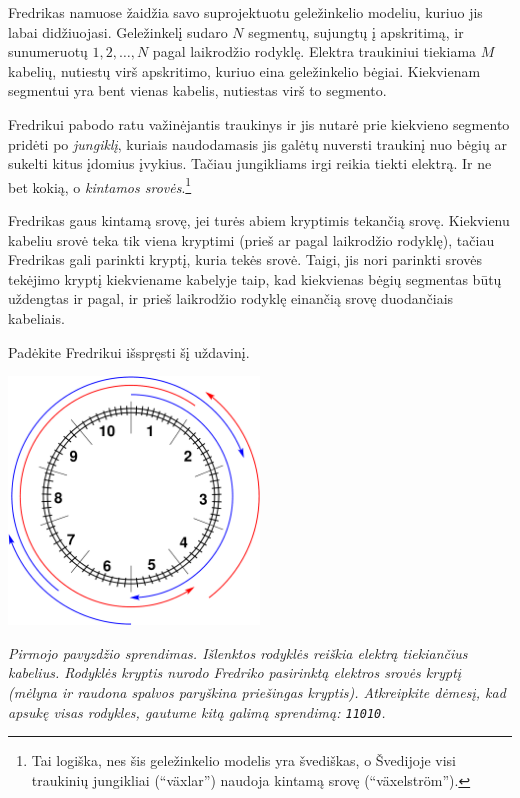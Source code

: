 \ifx\boi\undefined\fi
\def\version{jury-1}
Fredrikas namuose žaidžia savo suprojektuotu geležinkelio modeliu, kuriuo jis labai didžiuojasi.
Geležinkelį sudaro $N$ segmentų, sujungtų į apskritimą, ir sunumeruotų $1, 2, \dots, N$ pagal laikrodžio rodyklę.
Elektra traukiniui tiekiama $M$ kabelių, nutiestų virš apskritimo, kuriuo eina geležinkelio bėgiai. 
Kiekvienam segmentui yra bent vienas kabelis, nutiestas virš to segmento.

Fredrikui pabodo ratu važinėjantis traukinys ir jis nutarė prie kiekvieno segmento pridėti po \emph{jungiklį}, kuriais naudodamasis jis galėtų nuversti traukinį nuo bėgių ar sukelti kitus įdomius įvykius. Tačiau jungikliams irgi reikia tiekti elektrą.
Ir ne bet kokią, o \emph{kintamos srovės}.\footnote{Tai logiška, nes šis geležinkelio modelis yra švediškas, o Švedijoje visi traukinių jungikliai (``växlar'') naudoja kintamą srovę (``växelström'').}


Fredrikas gaus kintamą srovę, jei turės abiem kryptimis tekančią srovę. Kiekvienu kabeliu srovė teka tik viena kryptimi (prieš ar pagal laikrodžio rodyklę), tačiau Fredrikas gali parinkti kryptį, kuria tekės srovė. Taigi, jis nori parinkti srovės tekėjimo kryptį kiekviename kabelyje taip, kad kiekvienas bėgių segmentas būtų uždengtas ir pagal, ir prieš laikrodžio rodyklę einančią srovę duodančiais kabeliais.

Padėkite Fredrikui išspręsti šį uždavinį.

\vspace{2mm}
\begin{center}
\includegraphics[width=0.5\textwidth]{alternatingfig.pdf}
\end{center}
\vspace{1mm} 
{\em Pirmojo pavyzdžio sprendimas. Išlenktos rodyklės reiškia elektrą tiekiančius kabelius. 
Rodyklės kryptis nurodo Fredriko pasirinktą elektros srovės kryptį (mėlyna ir raudona spalvos paryškina priešingas kryptis). Atkreipkite dėmesį, kad apsukę visas rodykles, gautume kitą galimą sprendimą: \texttt{11010}.}

